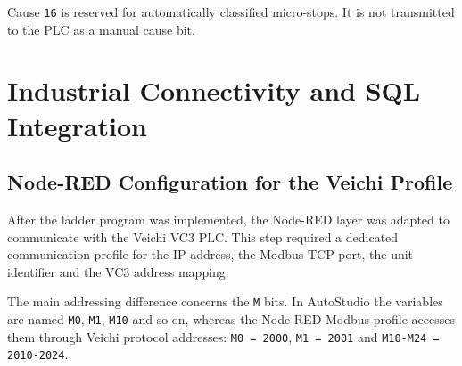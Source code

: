 Cause \texttt{16} is reserved for automatically classified micro-stops. It is not transmitted to the PLC as a manual cause bit.

\section{Industrial Connectivity and SQL Integration}

\subsection{Node-RED Configuration for the Veichi Profile}
After the ladder program was implemented, the Node-RED layer was adapted to communicate with the Veichi VC3 PLC. This step required a dedicated communication profile for the IP address, the Modbus TCP port, the unit identifier and the VC3 address mapping.

\begin{table}[H]
\centering
\caption{Main communication parameters for the Veichi VC3 PLC}
\end{table}

The main addressing difference concerns the \texttt{M} bits. In AutoStudio the variables are named \texttt{M0}, \texttt{M1}, \texttt{M10} and so on, whereas the Node-RED Modbus profile accesses them through Veichi protocol addresses: \texttt{M0 = 2000}, \texttt{M1 = 2001} and \texttt{M10-M24 = 2010-2024}.

